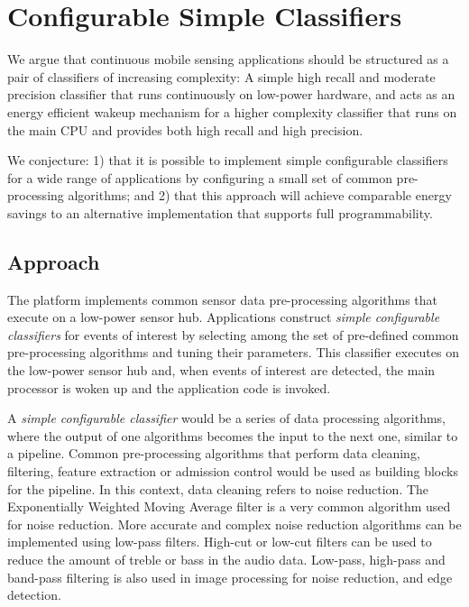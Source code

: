 \section{Configurable Simple Classifiers}
\label{sec:conjecture}

We argue that continuous mobile sensing applications should be
structured as a pair of classifiers of increasing complexity: A simple
high recall and moderate precision classifier that runs continuously
on low-power hardware, and acts as an energy efficient wakeup
mechanism for a higher complexity classifier that runs on the main CPU
and provides both high recall and high precision.

We conjecture: 1) that it is possible to implement simple configurable classifiers for a 
wide range of applications by configuring a small set of common pre-processing 
algorithms; and  2) that this approach will achieve comparable energy 
savings to an alternative implementation that supports full programmability.

\subsection {Approach}

The platform implements common sensor data pre-processing algorithms that
execute on a low-power sensor hub.  Applications construct 
{\em  simple configurable classifiers} for events of interest by selecting among the
set of pre-defined common pre-processing algorithms and tuning their
parameters.  This classifier executes on the
low-power sensor hub and, when events of interest are detected, the
main processor is woken up and the application code is invoked.
  
A {\em simple configurable classifier} would be a series of data processing algorithms, 
where the output of one algorithms becomes the input to the next one, similar
to a pipeline.  Common pre-processing algorithms that perform data cleaning, 
filtering, feature extraction or admission control would be used as building 
blocks for the pipeline.  In this context, data cleaning refers to noise 
reduction.  The Exponentially Weighted Moving Average filter
is a very common algorithm used for noise reduction.  More accurate and complex
noise reduction algorithms can be implemented using low-pass filters.  High-cut
or low-cut filters can be used to reduce the amount of treble or bass in the
audio data.  Low-pass, high-pass and band-pass filtering is also used in image 
processing for noise reduction, and edge detection.  

